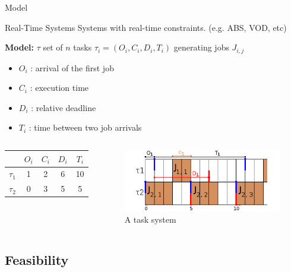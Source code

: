 \documentclass{beamer}
\begin{document}
	\begin{frame}{Model}
  \begin{block}{Real-Time Systems}
  Systems with real-time constraints. (e.g. ABS, VOD, etc)
  \end{block}
  \textbf{Model:} $\tau$ set of $n$ tasks $\tau_i = (O_i, C_i, D_i, T_i)$ generating jobs $J_{i,j}$
      \begin{itemize}
      \item $O_i$ : arrival of the first job
      \item $C_i$ : execution time
      \item $D_i$ : relative deadline
      \item $T_i$ : time between two job arrivals
    \end{itemize}

  \begin{columns}[c] %
\begin{center}
\begin{tabular}{|r|c|c|c|c|}
 \hline
  & $O_i$ & $C_i$ & $D_i$ & $T_i$ \\
 \hline
 $\tau_1$ & 1 & 2 & 6 & 10\\
 \hline
 $\tau_2$ & 0 & 3 & 5 & 5\\
 \hline
\end{tabular}
\end{center}

\begin{figure}[h]
\includegraphics[width=\textwidth]{figs/RTsystem_example.png}
\caption{A task system}
\label{fig:llf}
\end{figure}
  \end{columns}
\end{frame}

    \subsection{Feasibility}
\end{document}
